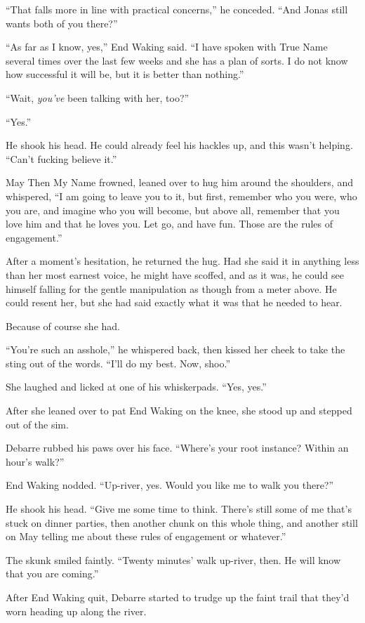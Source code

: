 ``That falls more in line with practical concerns,'' he conceded. ``And Jonas still wants both of you there?''

``As far as I know, yes,'' End Waking said. ``I have spoken with True Name several times over the last few weeks and she has a plan of sorts. I do not know how successful it will be, but it is better than nothing.''

``Wait, \emph{you've} been talking with her, too?''

``Yes.''

He shook his head. He could already feel his hackles up, and this wasn't helping. ``Can't fucking believe it.''

May Then My Name frowned, leaned over to hug him around the shoulders, and whispered, ``I am going to leave you to it, but first, remember who you were, who you are, and imagine who you will become, but above all, remember that you love him and that he loves you. Let go, and have fun. Those are the rules of engagement.''

After a moment's hesitation, he returned the hug. Had she said it in anything less than her most earnest voice, he might have scoffed, and as it was, he could see himself falling for the gentle manipulation as though from a meter above. He could resent her, but she had said exactly what it was that he needed to hear.

Because of course she had.

``You're such an asshole,'' he whispered back, then kissed her cheek to take the sting out of the words. ``I'll do my best. Now, shoo.''

She laughed and licked at one of his whiskerpads. ``Yes, yes.''

After she leaned over to pat End Waking on the knee, she stood up and stepped out of the sim.

Debarre rubbed his paws over his face. ``Where's your root instance? Within an hour's walk?''

End Waking nodded. ``Up-river, yes. Would you like me to walk you there?''

He shook his head. ``Give me some time to think. There's still some of me that's stuck on dinner parties, then another chunk on this whole thing, and another still on May telling me about these rules of engagement or whatever.''

The skunk smiled faintly. ``Twenty minutes' walk up-river, then. He will know that you are coming.''

After End Waking quit, Debarre started to trudge up the faint trail that they'd worn heading up along the river.

